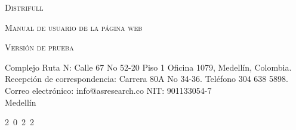 \thispagestyle{empty}
\vspace*{0.5cm}
\begin{center}
	{\Large\scshape Distrifull\\[5pt] }
\end{center}


\vspace*{1cm}
\begin{center}
\end{center}

\vspace*{1cm}
\begin{center}
	{\Large\scshape Manual de usuario de la p\'agina web}
\end{center}

\vspace*{2cm}
\begin{center}
	{\large\scshape Versi\'on de prueba \\ [3.pt]  }
\end{center}

\vspace*{2cm}
\begin{center}
	{Complejo Ruta N: Calle 67 No 52-20 Piso 1 Oficina 1079, Medell\'in, Colombia. }\\
	\vspace*{.5mm}
	{ 		Recepci\'on de correspondencia: Carrera 80A No 34-36. Tel\'efono 304 638 5898. }\\
	\vspace*{.5mm}
	{ 		Correo electr\'onico: info@asresearch.co
		NIT: 901133054-7}\\
	\vspace{1cm}
	{Medell\'in}\\
\end{center}

\hfill
\begin{center}
	2\ 0\ 2\ 2
\end{center}
